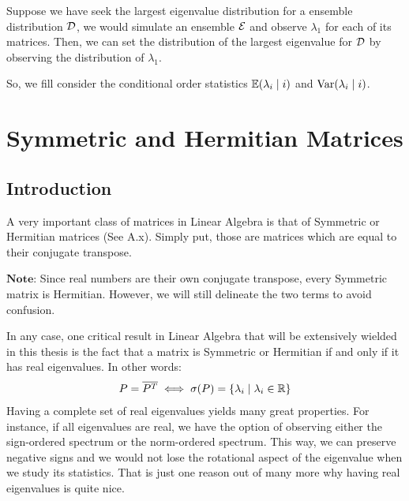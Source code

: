 \begin{example}
Suppose we have seek the largest eigenvalue distribution for a ensemble distribution $\mathcal{D}$, we would simulate an ensemble $\mathcal{E}$ and observe $\lambda_1$ for each of its matrices. Then, we can set the distribution of the largest eigenvalue for $\mathcal{D}$ by observing the distribution of $\lambda_1$. 
\end{example}

So, we fill consider the conditional order statistics $\mathbb{E}(\lambda_{i} \mid i)$ and $\text{Var}(\lambda_{i} \mid i)$.


\section{Symmetric and Hermitian Matrices}

\subsection{Introduction}

A very important class of matrices in Linear Algebra is that of Symmetric or Hermitian matrices (See A.x). Simply put, those are matrices which are equal to their conjugate transpose. 

$\textbf{Note:}$ Since real numbers are their own conjugate transpose, every Symmetric matrix is Hermitian. However, we will still delineate the two terms to avoid confusion.

In any case, one critical result in Linear Algebra that will be extensively wielded in this thesis is the fact that a matrix is Symmetric or Hermitian if and only if it has real eigenvalues. In other words:
\begin{align*}
P = \overline{P^{T}} \iff \sigma(P) = \{\lambda_i \mid \lambda_i \in \mathbb{R}\}
\end{align*}
Having a complete set of real eigenvalues yields many great properties. For instance, if all eigenvalues are real, we have the option of observing either the sign-ordered spectrum or the norm-ordered spectrum. This way, we can preserve negative signs and we would not lose the rotational aspect of the eigenvalue when we study its statistics. That is just one reason out of many more why having real eigenvalues is quite nice.

